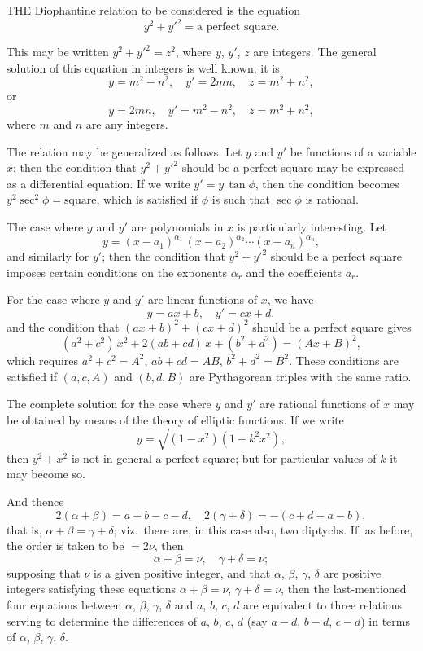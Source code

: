 \documentclass[11pt,a4paper]{book}
\begin{document}
\medskip\noindent
THE Diophantine relation to be considered is the equation
\[
y^{2} + y'^{2} = \text{a perfect square}.
\]

This may be written $y^{2} + y'^{2} = z^{2}$, where $y$, $y'$, $z$ are integers. The general solution of this equation in integers is well known; it is
\[
y = m^{2} - n^{2}, \quad y' = 2mn, \quad z = m^{2} + n^{2},
\]
or
\[
y = 2mn, \quad y' = m^{2} - n^{2}, \quad z = m^{2} + n^{2},
\]
where $m$ and $n$ are any integers.

\medskip\noindent
The relation may be generalized as follows. Let $y$ and $y'$ be functions of a variable $x$; then the condition that $y^{2} + y'^{2}$ should be a perfect square may be expressed as a differential equation. If we write $y' = y\,\tan\phi$, then the condition becomes $y^{2}\sec^{2}\phi = \text{square}$, which is satisfied if $\phi$ is such that $\sec\phi$ is rational.

\medskip\noindent
The case where $y$ and $y'$ are polynomials in $x$ is particularly interesting. Let
\[
y = (x - a_{1})^{\alpha_{1}}\,(x - a_{2})^{\alpha_{2}} \cdots (x - a_{n})^{\alpha_{n}},
\]
and similarly for $y'$; then the condition that $y^{2} + y'^{2}$ should be a perfect square imposes certain conditions on the exponents $\alpha_{r}$ and the coefficients $a_{r}$.

\medskip\noindent
For the case where $y$ and $y'$ are linear functions of $x$, we have
\[
y = ax + b, \quad y' = cx + d,
\]
and the condition that $(ax+b)^{2} + (cx+d)^{2}$ should be a perfect square gives
\[
(a^{2} + c^{2})\,x^{2} + 2(ab + cd)\,x + (b^{2} + d^{2}) = (Ax + B)^{2},
\]
which requires $a^{2} + c^{2} = A^{2}$, $ab + cd = AB$, $b^{2} + d^{2} = B^{2}$. These conditions are satisfied if $(a, c, A)$ and $(b, d, B)$ are Pythagorean triples with the same ratio.

\medskip\noindent
The complete solution for the case where $y$ and $y'$ are rational functions of $x$ may be obtained by means of the theory of elliptic functions. If we write
\[
y = \sqrt{(1 - x^{2})(1 - k^{2}x^{2})},
\]
then $y^{2} + x^{2}$ is not in general a perfect square; but for particular values of $k$ it may become so.

\medskip\noindent
And thence
\[
2(\alpha + \beta) = a + b - c - d, \quad 2(\gamma + \delta) = -(c + d - a - b),
\]
that is, $\alpha + \beta = \gamma + \delta$; viz.\ there are, in this case also, two diptychs. If, as before, the order is taken to be $= 2\nu$, then
\[
\alpha + \beta = \nu, \quad \gamma + \delta = \nu;
\]
supposing that $\nu$ is a given positive integer, and that $\alpha$, $\beta$, $\gamma$, $\delta$ are positive integers satisfying these equations $\alpha + \beta = \nu$, $\gamma + \delta = \nu$, then the last-mentioned four equations between $\alpha$, $\beta$, $\gamma$, $\delta$ and $a$, $b$, $c$, $d$ are equivalent to three relations serving to determine the differences of $a$, $b$, $c$, $d$ (say $a - d$, $b - d$, $c - d$) in terms of $\alpha$, $\beta$, $\gamma$, $\delta$.
\end{document}
